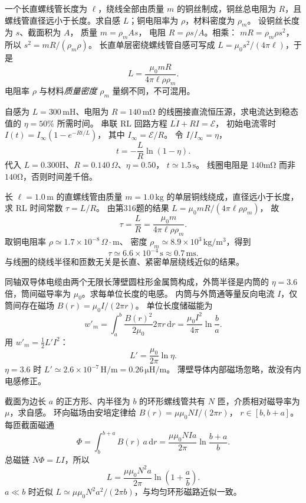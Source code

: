 一个长直螺线管长度为 $\ell$，绕线全部由质量 $m$ 的铜丝制成，铜丝总电阻为 $R$，且螺线管直径远小于长度。求自感 $L$；铜电阻率为 $\rho$，材料密度为 $\rho_m$。
\exsolution
设铜丝长度为 $s$、截面积为 $A$，
质量 $m=\rho_mAs$，
电阻 $R=\rho s/A$。相乘：
$mR=\rho_m\rho s^2$，所以
$s^2=mR/(\rho_m\rho)$。
长直单层密绕螺线管自感可写成
$L=\mu_0s^2/(4\pi\ell)$，于是
\[
\boxed{L=\frac{\mu_0mR}{4\pi\ell\rho\rho_m}}.
\]
\excheck 电阻率 $\rho$ 与材料\emph{质量密度} $\rho_m$ 量纲不同，不可混用。

自感为 $L=300\,\mathrm{mH}$、电阻为 $R=140\,\mathrm{m\Omega}$ 的线圈接直流恒压源，求电流达到稳态值的 $\eta=50\%$ 所需时间。
\exsolution
串联 RL 回路方程
$L\dot I+RI=\mathcal E$，
初始电流零时
$I(t)=I_\infty(1-e^{-Rt/L})$，
其中 $I_\infty=\mathcal E/R$。
令 $I/I_\infty=\eta$，
\[
\boxed{t=-\frac LR\ln(1-\eta)}.
\]
代入 $L=0.300$H、$R=0.140\,\Omega$、$\eta=0.50$，
$\boxed{t\simeq1.5\,\mathrm s}$。
\excheck 线圈电阻是 $140$mΩ 而非 $140$Ω，否则时间差千倍。

长 $\ell=1.0\,\mathrm m$ 的直螺线管由质量 $m=1.0\,\mathrm{kg}$ 的单层铜线绕成，直径远小于长度，求 RL 时间常数 $\tau=L/R$。
\exsolution
由第316题的结果
$L=\mu_0mR/(4\pi\ell\rho\rho_m)$，
故
\[
\boxed{\tau=\frac LR=\frac{\mu_0m}{4\pi\ell\rho\rho_m}}.
\]
取铜电阻率
$\rho\simeq1.7\times10^{-8}\,\Omega\cdot\mathrm m$、
密度 $\rho_m\simeq8.9\times10^3\,\mathrm{kg/m^3}$，得到
\[
\boxed{\tau\simeq6.6\times10^{-4}\,\mathrm s
\approx0.7\,\mathrm{ms}}.
\]
\excheck 与线圈的绕线半径和匝数无关是长直、紧密单层绕线近似的结果。

同轴双导体电缆由两个无限长薄壁圆柱形金属筒构成，外筒半径是内筒的 $\eta=3.6$ 倍，筒间磁导率为 $\mu_0$。求每单位长度的电感。
\exsolution
内筒与外筒通等量反向电流 $I$，仅筒间存在磁场
$B(r)=\mu_0I/(2\pi r)$。
单位长度储磁能为
\[
w'_m=\int_a^b\frac{B(r)^2}{2\mu_0}2\pi r\,\mathrm dr
=\frac{\mu_0I^2}{4\pi}\ln\frac ba.
\]
用 $w'_m=\tfrac12L'I^2$：
\[
\boxed{L'=\frac{\mu_0}{2\pi}\ln\eta}.
\]
$\eta=3.6$ 时
$\boxed{L'\simeq2.6\times10^{-7}\,\mathrm{H/m}
=0.26\,\mathrm{\mu H/m}}$。
\excheck 薄壁导体内部磁场忽略，故没有内电感修正。

截面为边长 $a$ 的正方形、内半径为 $b$ 的环形螺线管共有 $N$ 匝，介质相对磁导率为 $\mu$，求自感。
\exsolution
环向磁场由安培定律给
$B(r)=\mu\mu_0NI/(2\pi r)$，
$r\in[b,b+a]$。
每匝截面磁通
\[
\Phi=\int_b^{b+a}B(r)\,a\,\mathrm dr
=\frac{\mu\mu_0NIa}{2\pi}\ln\frac{b+a}{b}.
\]
总磁链 $N\Phi=LI$，所以
\[
\boxed{L=\frac{\mu\mu_0N^2a}{2\pi}
\ln\left(1+\frac ab\right)}.
\]
\excheck $a\ll b$ 时近似
$L\simeq\mu\mu_0N^2a^2/(2\pi b)$，与均匀环形磁路近似一致。

